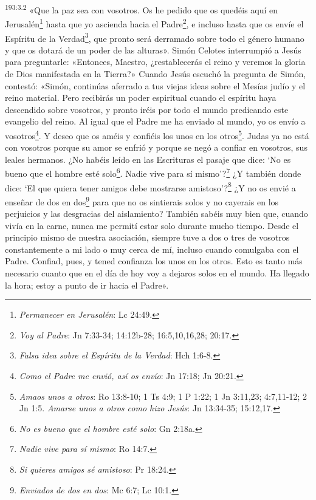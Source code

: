 \par
\textsuperscript{193:3.2} «Que la paz sea con vosotros. Os he pedido que os quedéis aquí en Jerusalén\footnote{\textit{Permanecer en Jerusalén}: Lc 24:49.} hasta que yo ascienda hacia el Padre\footnote{\textit{Voy al Padre}: Jn 7:33-34; 14:12b-28; 16:5,10,16,28; 20:17.}, e incluso hasta que os envíe el Espíritu de la Verdad\footnote{\textit{Falsa idea sobre el Espíritu de la Verdad}: Hch 1:6-8.}, que pronto será derramado sobre todo el género humano y que os dotará de un poder de las alturas». Simón Celotes interrumpió a Jesús para preguntarle: «Entonces, Maestro, ¿restablecerás el reino y veremos la gloria de Dios manifestada en la Tierra?» Cuando Jesús escuchó la pregunta de Simón, contestó: «Simón, continúas aferrado a tus viejas ideas sobre el Mesías judío y el reino material. Pero recibirás un poder espiritual cuando el espíritu haya descendido sobre vosotros, y pronto iréis por todo el mundo predicando este evangelio del reino. Al igual que el Padre me ha enviado al mundo, yo os envío a vosotros\footnote{\textit{Como el Padre me envió, así os envío}: Jn 17:18; Jn 20:21.}. Y deseo que os améis y confiéis los unos en los otros\footnote{\textit{Amaos unos a otros}: Ro 13:8-10; 1 Ts 4:9; 1 P 1:22; 1 Jn 3:11,23; 4:7,11-12; 2 Jn 1:5. \textit{Amarse unos a otros como hizo Jesús}: Jn 13:34-35; 15:12,17.}. Judas ya no está con vosotros porque su amor se enfrió y porque se negó a confiar en vosotros, sus leales hermanos. ¿No habéis leído en las Escrituras el pasaje que dice: `No es bueno que el hombre esté solo\footnote{\textit{No es bueno que el hombre esté solo}: Gn 2:18a.}. Nadie vive para sí mismo'?\footnote{\textit{Nadie vive para sí mismo}: Ro 14:7.} ¿Y también donde dice: `El que quiera tener amigos debe mostrarse amistoso'?\footnote{\textit{Si quieres amigos sé amistoso}: Pr 18:24.} ¿Y no os envié a enseñar de dos en dos\footnote{\textit{Enviados de dos en dos}: Mc 6:7; Lc 10:1.} para que no os sintierais solos y no cayerais en los perjuicios y las desgracias del aislamiento? También sabéis muy bien que, cuando vivía en la carne, nunca me permití estar solo durante mucho tiempo. Desde el principio mismo de nuestra asociación, siempre tuve a dos o tres de vosotros constantemente a mi lado o muy cerca de mí, incluso cuando comulgaba con el Padre. Confiad, pues, y tened confianza los unos en los otros. Esto es tanto más necesario cuanto que en el día de hoy voy a dejaros solos en el mundo. Ha llegado la hora; estoy a punto de ir hacia el Padre».

